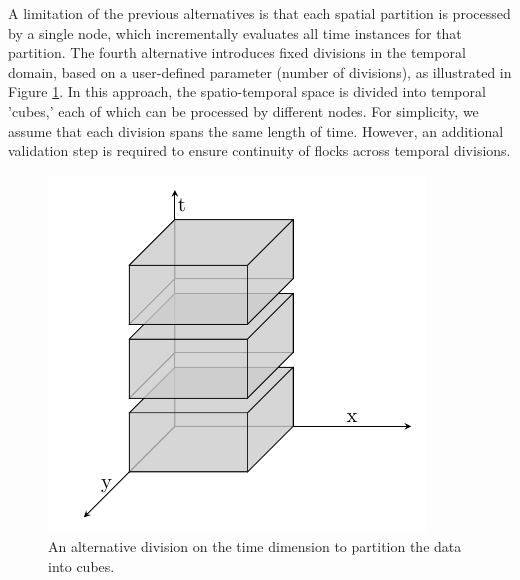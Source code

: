 A limitation of the previous alternatives is that each spatial partition is processed by a single node, which incrementally evaluates all time instances for that partition. The fourth alternative introduces fixed divisions in the temporal domain, based on a user-defined parameter (number of divisions), as illustrated in Figure \ref{fig:cube_alternative}. In this approach, the spatio-temporal space is divided into temporal 'cubes,' each of which can be processed by different nodes. For simplicity, we assume that each division spans the same length of time. However, an additional validation step is required to ensure continuity of flocks across temporal divisions.

\begin{figure}
    \centering
    \includegraphics[width=0.8\linewidth]{figures/cubo.pdf}
    \caption{An alternative division on the time dimension to partition the data into cubes.}\label{fig:cube_alternative}
\end{figure}
